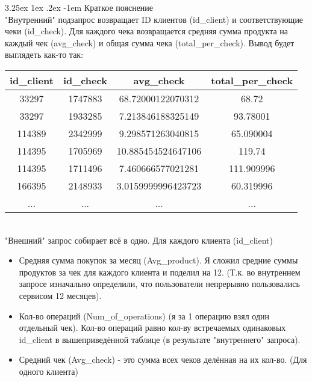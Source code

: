 \documentclass[12pt, a3paper]{article}
\makeatletter
\renewcommand\paragraph{\@startsection{paragraph}{5}{\z@}%
  {3.25ex \@plus1ex \@minus.2ex}%
  {-1em}%
  {\normalfont\normalsize\bfseries}}
\makeatother
\begin{document}
\paragraph{Краткое пояснение}
\leavevmode \\
"Внутренний" подзапрос возвращает ID клиентов (id\_client) и соответствующие чеки (id\_check).
Для каждого чека возвращается средняя сумма продукта на каждый чек (avg\_check) и общая сумма чека (total\_per\_check).
Вывод будет выглядеть как-то так:
\begin{table}[!h]
    \begin{tabular}{|c|c|c|c|}
    \hline
    id\_client & id\_check & avg\_check         & total\_per\_check \\ \hline
    33297      & 1747883   & 68.72000122070312  & 68.72             \\ \hline
    33297      & 1933285   & 7.213846188325149  & 93.78001          \\ \hline
    114389     & 2342999   & 9.298571263040815  & 65.090004         \\ \hline
    114395     & 1705969   & 10.885454524647106 & 119.74            \\ \hline
    114395     & 1711496   & 7.460666577021281  & 111.909996        \\ \hline
    166395     & 2148933   & 3.0159999996423723 & 60.319996         \\ \hline
    ...        & ...       & ...                & ...               \\ \hline
    \end{tabular}
\end{table}\\
\noindent
"Внешний" запрос собирает всё в одно. Для каждого клиента (id\_client)
\begin{itemize}
    \item Средняя сумма покупок за месяц (Avg\_product). Я сложил средние суммы продуктов за чек 
    для каждого клиента и поделил на 12. (Т.к. во внутреннем запросе изначально определили,
    что пользователи непрерывно пользовались сервисом 12 месяцев).
    \item Кол-во операций (Num\_of\_operations) (я за 1 операцию взял один отдельный чек).
    Кол-во операций равно кол-ву встречаемых одинаковых id\_client в вышеприведённой таблице (в результате "внутреннего" запроса).
    \item Средний чек (Avg\_check) - это сумма всех чеков делённая на их кол-во. (Для одного клиента)
\end{itemize}
\end{document}
